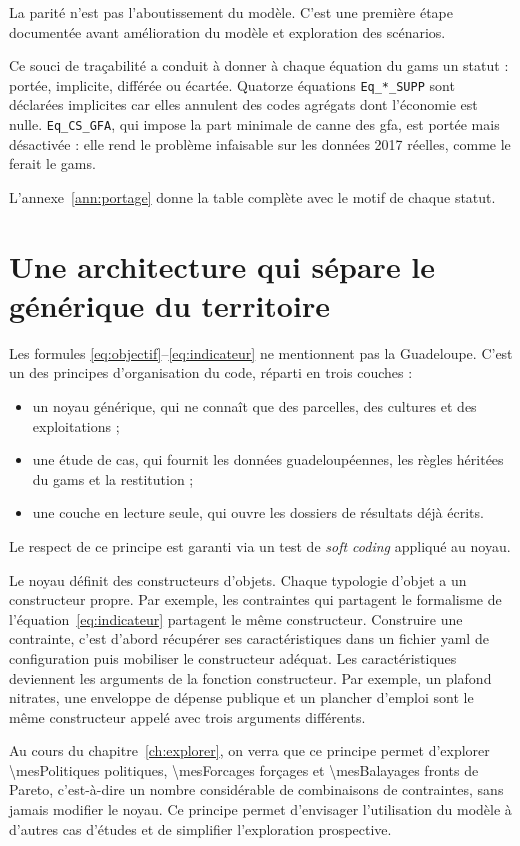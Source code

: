 La parité n'est pas l'aboutissement du modèle. C'est une première étape documentée avant
amélioration du modèle et exploration des scénarios.

Ce souci de traçabilité a conduit à donner à chaque équation du \gls{gams} un statut : portée,
implicite, différée ou écartée. Quatorze équations \texttt{Eq\_*\_SUPP} sont déclarées implicites
car elles annulent des codes agrégats dont l'économie est nulle. \texttt{Eq\_CS\_GFA}, qui impose
la part minimale de canne des \gls{gfa}, est portée mais désactivée : elle rend le problème
infaisable sur les données 2017 réelles, comme le ferait le \gls{gams}.

L'annexe~\ref{ann:portage} donne la table complète avec le motif de chaque statut.

\section{Une architecture qui sépare le générique du territoire}
\label{sec:architecture}

Les formules \eqref{eq:objectif}--\eqref{eq:indicateur} ne mentionnent pas la Guadeloupe. C'est
un des principes d'organisation du code, réparti en trois couches :
\begin{itemize}
  \item un noyau générique, qui ne connaît que des parcelles, des cultures et des exploitations ;
  \item une étude de cas, qui fournit les données guadeloupéennes, les règles héritées du
    \gls{gams} et la restitution ;
  \item une couche en lecture seule, qui ouvre les dossiers de résultats déjà écrits.
\end{itemize}
Le respect de ce principe est garanti via un test de \emph{soft coding} appliqué au noyau.

Le noyau définit des constructeurs d'objets. Chaque typologie d'objet a un constructeur propre.
Par exemple, les contraintes qui partagent le formalisme de l'équation~\eqref{eq:indicateur}
partagent le même constructeur. Construire une contrainte, c'est d'abord récupérer ses
caractéristiques dans un fichier \gls{yaml} de configuration puis mobiliser le constructeur
adéquat. Les caractéristiques deviennent les arguments de la fonction constructeur. Par exemple,
un plafond nitrates, une enveloppe de dépense publique et un plancher d'emploi sont le même
constructeur appelé avec trois arguments différents.

Au cours du chapitre~\ref{ch:explorer}, on verra que ce principe permet d'explorer
\num{\mesPolitiques} politiques, \num{\mesForcages} forçages et \num{\mesBalayages} fronts de
Pareto, c'est-à-dire un nombre considérable de combinaisons de contraintes, sans jamais modifier
le noyau. Ce principe permet d'envisager l'utilisation du modèle à d'autres cas d'études et de
simplifier l'exploration prospective.


